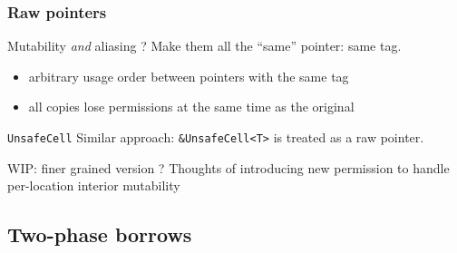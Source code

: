 \begin{frame}
    \frametitle{Raw pointers}
    \begin{block}{Mutability \textit{and} aliasing ?}
        Make them all the ``same'' pointer: same tag.
        \begin{itemize}
            \item arbitrary usage order between pointers with the same tag
            \item all copies lose permissions at the same time as the original
        \end{itemize}
    \end{block}

    \begin{block}{\texttt{UnsafeCell}}
        Similar approach: \texttt{\&UnsafeCell<T>} is treated as a raw pointer.
    \end{block}

    \begin{exampleblock}{WIP: finer grained version ?}
        Thoughts of introducing new permission to handle per-location interior mutability
    \end{exampleblock}
\end{frame}

\subsection{Two-phase borrows}

